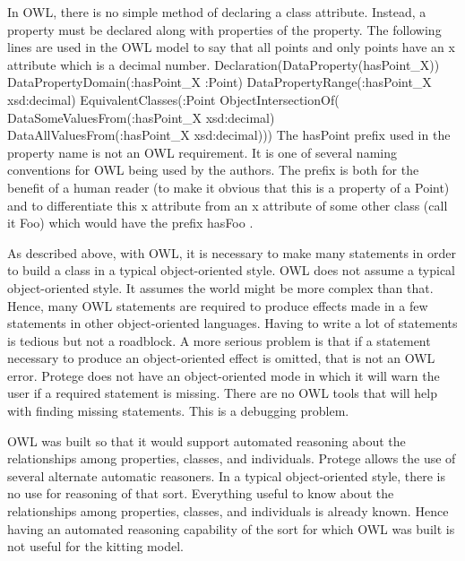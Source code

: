 In OWL, there is no simple method of declaring a class attribute. Instead,
a property must be declared along with properties of the property. The
following lines are used in the OWL model to say that all points and only
points have an x attribute which is a decimal number.
\newline
\newline \sf Declaration(DataProperty(hasPoint\_X))
\newline DataPropertyDomain(:hasPoint\_X :Point)
\newline DataPropertyRange(:hasPoint\_X xsd:decimal)
\newline EquivalentClasses(:Point ObjectIntersectionOf(
\newline DataSomeValuesFrom(:hasPoint\_X xsd:decimal)
\newline DataAllValuesFrom(:hasPoint\_X xsd:decimal))) \rm \newline
\newline
The \sf hasPoint \rm prefix used in the property name is not an OWL
requirement. It is one of several naming conventions for OWL being used by
the authors. The prefix is both for the benefit of a human reader (to make
it obvious that this is a property of a Point) and to differentiate this x
attribute from an x attribute of some other class (call it \sf Foo\rm)
which would have the prefix \sf hasFoo \rm.

As described above, with OWL, it is necessary to make many statements in
order to build a class in a typical object-oriented style. OWL does not
assume a typical object-oriented style. It assumes the world might be more
complex than that. Hence, many OWL statements are required to produce
effects made in a few statements in other object-oriented languages. Having
to write a lot of statements is tedious but not a roadblock. A more serious
problem is that if a statement necessary to produce an object-oriented
effect is omitted, that is not an OWL error. Protege does not have an
object-oriented mode in which it will warn the user if a required statement
is missing. There are no OWL tools that will help with finding missing
statements. This is a debugging problem.

OWL was built so that it would support automated reasoning about the
relationships among properties, classes, and individuals. Protege allows
the use of several alternate automatic reasoners. In a typical
object-oriented style, there is no use for reasoning of that sort.
Everything useful to know about the relationships among properties,
classes, and individuals is already known. Hence having an automated
reasoning capability of the sort for which OWL was built is not useful
for the kitting model.\\

